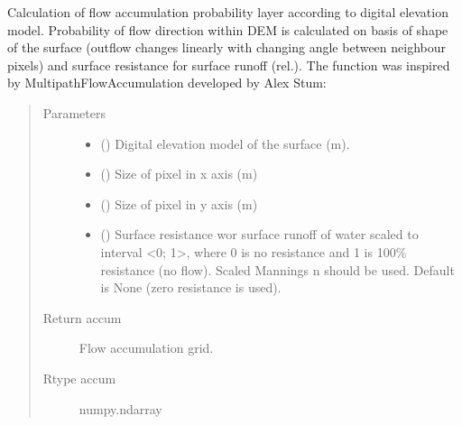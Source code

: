 \documentclass[letterpaper,10pt,english]{sphinxmanual}
\begin{document}
\begin{fulllineitems}
\begin{fulllineitems}
\label{\detokenize{libs:waterflow.WaterBalance.flowAccProb}}
Calculation of flow accumulation probability layer according
to digital elevation model. Probability of flow direction within
DEM is calculated on basis of shape of the surface (outflow
changes linearly with changing angle between neighbour pixels) 
and surface resistance for surface runoff (rel.).
The function was inspired by Multipath\sphinxhyphen{}Flow\sphinxhyphen{}Accumulation developed
by Alex Stum: 
\begin{quote}\begin{description}
\item[{Parameters}] \leavevmode\begin{itemize}
\item {} 
 () \textendash{} Digital elevation model of the surface (m).

\item {} 
 () \textendash{} Size of pixel in x axis (m)

\item {} 
 () \textendash{} Size of pixel in y axis (m)

\item {} 
 () \textendash{} Surface resistance wor surface runoff of water scaled
to interval \textless{}0; 1\textgreater{}, where 0 is no resistance
and 1 is 100\% resistance (no flow). Scaled Mannings n
should be used. Default is None (zero resistance is used).

\end{itemize}

\item[{Return accum}] \leavevmode
Flow accumulation grid.

\item[{Rtype accum}] \leavevmode
numpy.ndarray


\end{description}
\end{quote}
\end{fulllineitems}
\end{fulllineitems}
\end{document}
